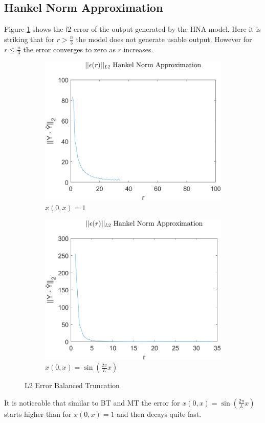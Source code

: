 \subsection{Hankel Norm Approximation}
Figure \ref{FIG-ERR-HNA} shows the \(l2\) error of the output generated by the HNA model.
Here it is striking that for \(r > \frac{n}{3}\) the model does not generate usable output.
However for \(r \leq \frac{n}{3}\) the error converges to zero as \(r\) increases.

\begin{figure}[H]
\begin{subfigure}[b]{0.5\textwidth}
\centering
\includegraphics[width=\textwidth]{images/L2_HNA}
\caption{$x(0, x) = 1$}
\label{FIG-ERR-HNA}
\end{subfigure}
\begin{subfigure}[b]{0.5\textwidth}
\centering
\includegraphics[width=\textwidth]{images/L2_HNA_SIN}
\caption{$x(0, x) = \sin(\frac{2\pi}{L}x)$}
\label{FIG-ERR-HNA-SIN}
\end{subfigure}
\caption{L2 Error Balanced Truncation}
\end{figure}
It is noticeable that similar to BT and MT the error for \(x(0, x) = \sin(\frac{2\pi}{L}x)\) starts higher than for \(x(0, x) = 1\) and then decays quite fast.

